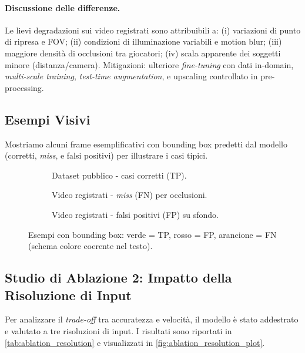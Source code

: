 \documentclass[12pt,a4paper,openright,twoside]{book}
\begin{document}
\paragraph{Discussione delle differenze.}
Le lievi degradazioni sui video registrati sono attribuibili a: (i) variazioni di punto di ripresa e FOV; 
(ii) condizioni di illuminazione variabili e motion blur; (iii) maggiore densità di occlusioni tra giocatori; 
(iv) scala apparente dei soggetti minore (distanza/camera). 
Mitigazioni: ulteriore \emph{fine-tuning} con dati in-domain, \emph{multi-scale training}, \emph{test-time augmentation}, 
e upscaling controllato in pre-processing.

\subsection{Esempi Visivi}
Mostriamo alcuni frame esemplificativi con bounding box predetti dal modello (corretti, \emph{miss}, 
e falsi positivi) per illustrare i casi tipici.

\begin{figure}[t]
  \centering
  \begin{subfigure}{0.32\linewidth}
    \caption{Dataset pubblico - casi corretti (TP).}
  \end{subfigure}\hfill
  \begin{subfigure}{0.32\linewidth}
    \caption{Video registrati - \emph{miss} (FN) per occlusioni.}
  \end{subfigure}\hfill
  \begin{subfigure}{0.32\linewidth}
    \caption{Video registrati - falsi positivi (FP) su sfondo.}
  \end{subfigure}
  \caption{Esempi con bounding box: verde = TP, rosso = FP, arancione = FN (schema colore coerente nel testo).}
  \label{fig:visual_examples}
\end{figure}

\subsection{Studio di Ablazione 2: Impatto della Risoluzione di Input}
Per analizzare il \emph{trade-off} tra accuratezza e velocità, il modello è stato addestrato e valutato a tre 
risoluzioni di input. 
I risultati sono riportati in \autoref{tab:ablation_resolution} e visualizzati in \autoref{fig:ablation_resolution_plot}.
\end{document}
